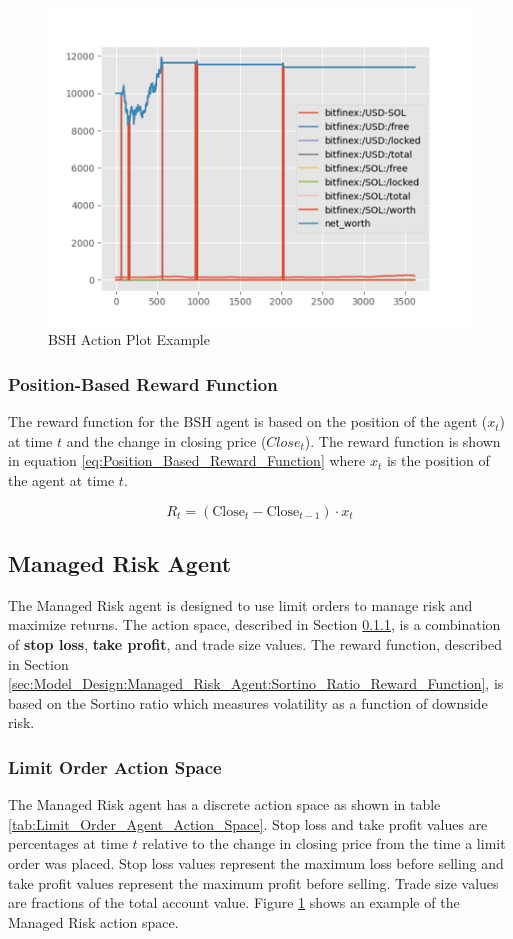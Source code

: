 \documentclass[journal]{new-aiaa}
\begin{document}
\begin{figure}[H]
        \centering
        \includegraphics[width=.5\textwidth]{figures/BSH_Action_Example.png}
        \caption{BSH Action Plot Example}
        \label{fig:Limit Order Action Plot Example}
\end{figure}

\subsubsection{Position-Based Reward Function}\label{sec:Model_Design:Buy_Sell_Hold_Agent:Position_Based_Reward_Function}
The reward function for the BSH agent is based on the position of the agent ($x_t$) at time $t$ and the change in closing price ($Close_t$).
The reward function is shown in equation \ref{eq:Position_Based_Reward_Function} where $x_t$ is the position of the agent at time $t$.

\begin{equation}\label{eq:Position_Based_Reward_Function}
        R_t = \left(\text{Close}_{t} - \text{Close}_{t-1}\right) \cdot x_t
\end{equation}

\subsection{Managed Risk Agent}\label{sec:Model_Design:Managed_Risk_Agent}
The Managed Risk agent is designed to use limit orders to manage risk and maximize returns.
The action space, described in Section \ref{sec:Model_Design:Managed_Risk_Agent:Limit_Order_Action_Space}, is a combination of \textbf{stop loss}, \textbf{take profit}, and trade size values.
The reward function, described in Section \ref{sec:Model_Design:Managed_Risk_Agent:Sortino_Ratio_Reward_Function}, is based on the Sortino ratio which measures volatility as a function of downside risk.

\subsubsection{Limit Order Action Space}\label{sec:Model_Design:Managed_Risk_Agent:Limit_Order_Action_Space}
The Managed Risk agent has a discrete action space as shown in table \ref{tab:Limit_Order_Agent_Action_Space}.
Stop loss and take profit values are percentages at time $t$ relative to the change in closing price from the time a limit order was placed.
Stop loss values represent the maximum loss before selling and take profit values represent the maximum profit before selling.
Trade size values are fractions of the total account value.
Figure \ref{fig:Limit Order Action Plot Example} shows an example of the Managed Risk action space.
\end{document}
